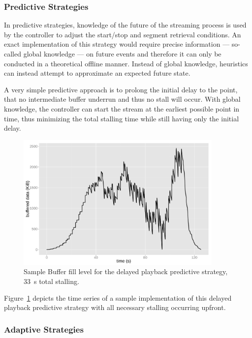 \subsubsection{Predictive Strategies}

In predictive strategies, knowledge of the future of the streaming process is used by the controller to adjust the start/stop and segment retrieval conditions. An exact implementation of this strategy would require precise information --- so-called global knowledge --- on future events and therefore it can only be conducted in a theoretical offline manner. Instead of global knowledge, heuristics can instead attempt to approximate an expected future state.

A very simple predictive approach is to prolong the initial delay to the point, that no intermediate buffer underrun and thus no stall will occur. With global knowledge, the controller can start the stream at the earliest possible point in time, thus minimizing the total stalling time while still having only the initial delay.

\begin{figure}[htb]
	\centering
	\includegraphics[width=0.9\textwidth]{images/R-bufferlevel-startdelay.pdf}
	\caption{Sample Buffer fill level for the delayed playback predictive strategy, \SI{33}{\second} total stalling.}
\label{c3:fig:bufferlevel-startdelay}
\end{figure}

Figure~\ref{c3:fig:bufferlevel-startdelay} depicts the time series of a sample implementation of this delayed playback predictive strategy with all necessary stalling occurring upfront.


\subsubsection{Adaptive Strategies}

